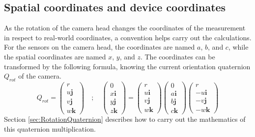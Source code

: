 \subsection{Spatial coordinates and device coordinates}
\label{sec:ABC_XYZ_coords}
As the rotation of the camera head changes the coordinates of the measurement in respect to real-world coordinates, a convention helps carry out the calculations. For the sensors on the camera head, the coordinates are named $a$, $b$, and $c$, while the spatial coordinates are named $x$, $y$, and $z$.
The coordinates can be transformed by the following formula, knowing the current orientation quaternion $Q_{rot}$ of the camera.   
\begin{equation*}
    Q_{rot}
    =
    \begin{pmatrix}
        r           \\
        u\textbf{j} \\
        v\textbf{j} \\
        w\textbf{k}
    \end{pmatrix}
    \quad ; \quad
    \begin{pmatrix}
        0           \\
        x\textbf{i} \\
        y\textbf{j} \\
        z\textbf{k}
    \end{pmatrix}
    =
    \begin{pmatrix}
        r           \\
        u\textbf{i} \\
        v\textbf{j} \\
        w\textbf{k}
    \end{pmatrix}
    \begin{pmatrix}
        0           \\
        a\textbf{i} \\
        b\textbf{j} \\
        c\textbf{k}
    \end{pmatrix}
    \begin{pmatrix}
        r           \\
        -u\textbf{i} \\
        -v\textbf{j} \\
        -w\textbf{k}
    \end{pmatrix}
\end{equation*}
Section \ref{sec:RotationQuaternion} describes how to carry out the mathematics of this quaternion multiplication. 
